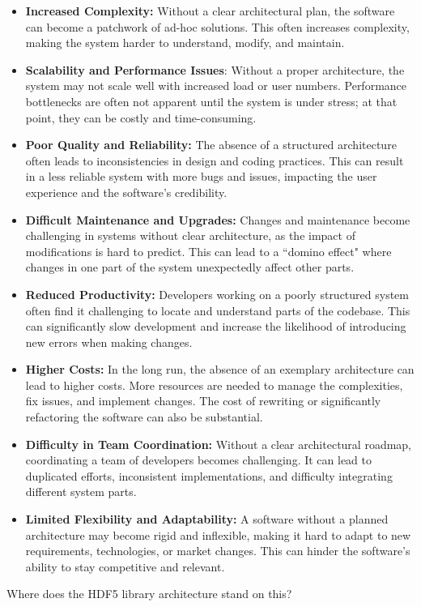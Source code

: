 \begin{itemize}
    \item \textbf{Increased Complexity:} Without a clear architectural plan, the software can become a patchwork of ad-hoc solutions. This often increases complexity, making the system harder to understand, modify, and maintain.
    \item \textbf{Scalability and Performance Issues}: Without a proper architecture, the system may not scale well with increased load or user numbers. Performance bottlenecks are often not apparent until the system is under stress; at that point, they can be costly and time-consuming.
    \item \textbf{Poor Quality and Reliability:} The absence of a structured architecture often leads to inconsistencies in design and coding practices. This can result in a less reliable system with more bugs and issues, impacting the user experience and the software's credibility.
    \item \textbf{Difficult Maintenance and Upgrades:} Changes and maintenance become challenging in systems without clear architecture, as the impact of modifications is hard to predict. This can lead to a ``domino effect" where changes in one part of the system unexpectedly affect other parts.
    \item \textbf{Reduced Productivity:} Developers working on a poorly structured system often find it challenging to locate and understand parts of the codebase. This can significantly slow development and increase the likelihood of introducing new errors when making changes.
    \item \textbf{Higher Costs:} In the long run, the absence of an exemplary architecture can lead to higher costs. More resources are needed to manage the complexities, fix issues, and implement changes. The cost of rewriting or significantly refactoring the software can also be substantial.
    \item \textbf{Difficulty in Team Coordination:} Without a clear architectural roadmap, coordinating a team of developers becomes challenging. It can lead to duplicated efforts, inconsistent implementations, and difficulty integrating different system parts.
    \item \textbf{Limited Flexibility and Adaptability:} A software without a planned architecture may become rigid and inflexible, making it hard to adapt to new requirements, technologies, or market changes. This can hinder the software's ability to stay competitive and relevant.
\end{itemize}

Where does the HDF5 library architecture stand on this?